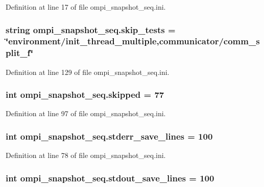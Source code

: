 Definition at line 17 of file ompi\-\_\-snapshot\-\_\-seq.\-ini.

\hypertarget{namespaceompi__snapshot__seq_a0a1e6182d0b6b408fd0b3642c5b52556}{
\subsubsection[{skip\-\_\-tests}]{\setlength{\rightskip}{0pt plus 5cm}string ompi\-\_\-snapshot\-\_\-seq.\-skip\-\_\-tests = \char`\"{}environment/init\-\_\-thread\-\_\-multiple,communicator/comm\-\_\-split\-\_\-f\char`\"{}}}\label{namespaceompi__snapshot__seq_a0a1e6182d0b6b408fd0b3642c5b52556}


Definition at line 129 of file ompi\-\_\-snapshot\-\_\-seq.\-ini.

\hypertarget{namespaceompi__snapshot__seq_a7261e8a10955a8c08df3d642714fb626}{
\subsubsection[{skipped}]{\setlength{\rightskip}{0pt plus 5cm}int ompi\-\_\-snapshot\-\_\-seq.\-skipped = 77}}\label{namespaceompi__snapshot__seq_a7261e8a10955a8c08df3d642714fb626}


Definition at line 97 of file ompi\-\_\-snapshot\-\_\-seq.\-ini.

\hypertarget{namespaceompi__snapshot__seq_a4c1170c00e6cc51822262da67c07d721}{
\subsubsection[{stderr\-\_\-save\-\_\-lines}]{\setlength{\rightskip}{0pt plus 5cm}int ompi\-\_\-snapshot\-\_\-seq.\-stderr\-\_\-save\-\_\-lines = 100}}\label{namespaceompi__snapshot__seq_a4c1170c00e6cc51822262da67c07d721}


Definition at line 78 of file ompi\-\_\-snapshot\-\_\-seq.\-ini.

\hypertarget{namespaceompi__snapshot__seq_a0521277c015b3e1b74418fc58101d5d6}{
\subsubsection[{stdout\-\_\-save\-\_\-lines}]{\setlength{\rightskip}{0pt plus 5cm}int ompi\-\_\-snapshot\-\_\-seq.\-stdout\-\_\-save\-\_\-lines = 100}}\label{namespaceompi__snapshot__seq_a0521277c015b3e1b74418fc58101d5d6}


